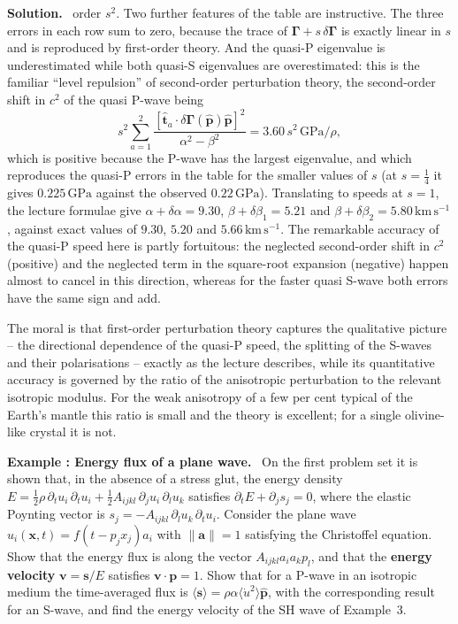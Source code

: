\documentclass[a4paper,12pt]{paper}
\newcounter{example}
\renewenvironment{example}[1]{%
  \refstepcounter{example}%
  \begin{mdframed}[linewidth=1pt,innertopmargin=6pt,innerbottommargin=6pt]%
  \noindent\textbf{Example \theexample: #1.}\ }{%
  \end{mdframed}}
\newenvironment{solution}{\par\noindent\textbf{Solution.}\ }{\par\medskip}
\begin{document}
\begin{solution}
order $s^{2}$. Two further features of the table are instructive. The three errors in each row
sum to zero, because the trace of $\bm{\Gamma}+s\,\delta\bm{\Gamma}$ is exactly linear in $s$
and is reproduced by first-order theory. And the quasi-P eigenvalue is underestimated while
both quasi-S eigenvalues are overestimated: this is the familiar ``level repulsion'' of
second-order perturbation theory, the second-order shift in $c^{2}$ of the quasi P-wave being
\begin{equation}
s^{2}\sum_{a=1}^{2}\frac{[\hat{\mathbf{t}}_{a}\cdot\delta\bm{\Gamma}(\hat{\mathbf{p}})\hat{\mathbf{p}}]^{2}}{\alpha^{2}-\beta^{2}}
=3.60\,s^{2}\,\mathrm{GPa}/\rho,
\label{eq:32}
\end{equation}
which is positive because the P-wave has the largest eigenvalue, and which reproduces the
quasi-P errors in the table for the smaller values of $s$ (at $s=\tfrac{1}{4}$ it gives $0.225\,\mathrm{GPa}$ against the
observed $0.22\,\mathrm{GPa}$). Translating to speeds at $s=1$, the lecture formulae give
$\alpha+\delta\alpha=9.30$, $\beta+\delta\beta_{1}=5.21$ and
$\beta+\delta\beta_{2}=5.80\,\mathrm{km\,s^{-1}}$, against exact values of $9.30$, $5.20$ and
$5.66\,\mathrm{km\,s^{-1}}$. The remarkable accuracy of the quasi-P speed here is partly
fortuitous: the neglected second-order shift in $c^{2}$ (positive) and the neglected term in the
square-root expansion (negative) happen almost to cancel in this direction, whereas for the
faster quasi S-wave both errors have the same sign and add.

The moral is that first-order perturbation theory captures the qualitative picture -- the
directional dependence of the quasi-P speed, the splitting of the S-waves and their
polarisations -- exactly as the lecture describes, while its quantitative accuracy is governed by
the ratio of the anisotropic perturbation to the relevant isotropic modulus. For the weak
anisotropy of a few per cent typical of the Earth's mantle this ratio is small and the theory is
excellent; for a single olivine-like crystal it is not.
\end{solution}

\begin{example}{Energy flux of a plane wave}
On the first problem set it is shown that, in the absence of a stress glut, the energy density
$E=\tfrac{1}{2}\rho\,\partial_{t}u_{i}\,\partial_{t}u_{i}+\tfrac{1}{2}A_{ijkl}\,\partial_{j}u_{i}\,\partial_{l}u_{k}$ satisfies
$\partial_{t}E+\partial_{j}s_{j}=0$, where the elastic Poynting vector is
$s_{j}=-A_{ijkl}\,\partial_{l}u_{k}\,\partial_{t}u_{i}$. Consider the plane wave
$u_{i}(\mathbf{x},t)=f(t-p_{j}x_{j})a_{i}$ with $\|\mathbf{a}\|=1$ satisfying the Christoffel
equation. Show that the energy flux is along the vector $A_{ijkl}a_{i}a_{k}p_{l}$, and that the
\textbf{energy velocity} $\mathbf{v}=\mathbf{s}/E$ satisfies $\mathbf{v}\cdot\mathbf{p}=1$.
Show that for a P-wave in an isotropic medium the time-averaged flux is
$\langle\mathbf{s}\rangle=\rho\alpha\langle\dot{u}^{2}\rangle\hat{\mathbf{p}}$, with the
corresponding result for an S-wave, and find the energy velocity of the SH wave of Example~3.
\end{example}
\end{document}
